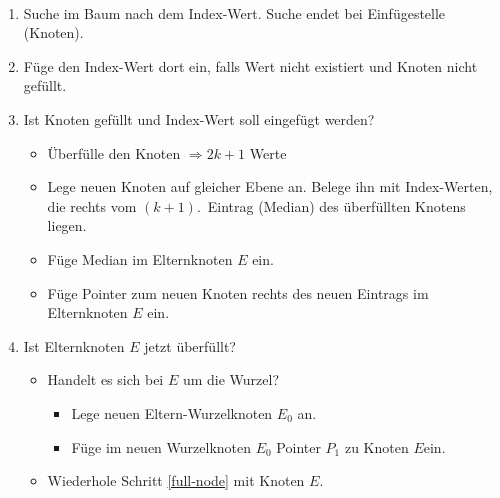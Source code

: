\begin{frame}{\insertsection}
\framesubtitle{\insertsubsection}
\begin{enumerate}
	\item Suche im Baum nach dem Index-Wert. Suche endet bei Einf\"ugestelle (Knoten).\pause
	\item F\"uge den Index-Wert dort ein, falls Wert nicht existiert und Knoten nicht gef\"ullt.\pause
	\item\label{full-node} Ist Knoten gef\"ullt und Index-Wert soll eingef\"ugt werden?\pause
	\begin{itemize}		
		\item	\"Uberf\"ulle den Knoten $\Rightarrow 2k+1$ Werte
		\item	Lege neuen Knoten auf gleicher Ebene an. Belege ihn mit Index-Werten, die rechts vom $(k+1)$.~Eintrag (Median)
		des \"uberf\"ullten Knotens liegen.
		\item	F\"uge Median im Elternknoten $E$ ein.
		\item	F\"uge Pointer zum neuen Knoten rechts des neuen Eintrags im Elternknoten $E$ ein.
	\end{itemize}\pause
	\item Ist Elternknoten $E$ jetzt überfüllt?\pause
	\begin{itemize}
		\item Handelt es sich bei $E$ um die Wurzel?
		\begin{itemize}
			\item Lege neuen Eltern-Wurzelknoten $E_0$ an.
			\item	F\"uge im neuen Wurzelknoten $E_0$ Pointer $P_1$ zu Knoten $E$ein.\pause
		\end{itemize}
		\item	Wiederhole Schritt \ref{full-node} mit Knoten $E$.
	\end{itemize}
\end{enumerate}
\end{frame}


